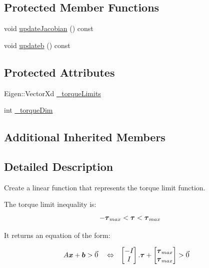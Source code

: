 \subsection*{Protected Member Functions}
\begin{DoxyCompactItemize}
\item 
void \hyperlink{classocra_1_1TorqueLimitFunction_ad33a9f6f6af6edd6b3c0cda6f915336b}{update\+Jacobian} () const
\item 
void \hyperlink{classocra_1_1TorqueLimitFunction_a157cb13ffdc53d3a7ed568b59154b0d0}{updateb} () const
\end{DoxyCompactItemize}
\subsection*{Protected Attributes}
\begin{DoxyCompactItemize}
\item 
Eigen\+::\+Vector\+Xd \hyperlink{classocra_1_1TorqueLimitFunction_a929154bb1273971f123d12ce810fd375}{\+\_\+torque\+Limits}
\item 
int \hyperlink{classocra_1_1TorqueLimitFunction_ae7eed81decd37aa8bb6baeb47c5fb4d0}{\+\_\+torque\+Dim}
\end{DoxyCompactItemize}
\subsection*{Additional Inherited Members}


\subsection{Detailed Description}
Create a linear function that represents the torque limit function. 

The torque limit inequality is\+: \[ - \mbox{\boldmath${\tau}$}_{max} < \mbox{\boldmath${\tau}$} < \mbox{\boldmath${\tau}$}_{max} \]

It returns an equation of the form\+:

\begin{align*} A \mbox{\boldmath${x}$} + \mbox{\boldmath${b}$} &> \vec{0} & &\Leftrightarrow & \begin{bmatrix} - I_{} \\ I_{} \end{bmatrix} . \mbox{\boldmath${\tau}$} + \begin{bmatrix} \mbox{\boldmath${\tau}$}_{max} \\ \mbox{\boldmath${\tau}$}_{max} \end{bmatrix} &> \vec{0} \end{align*} 

